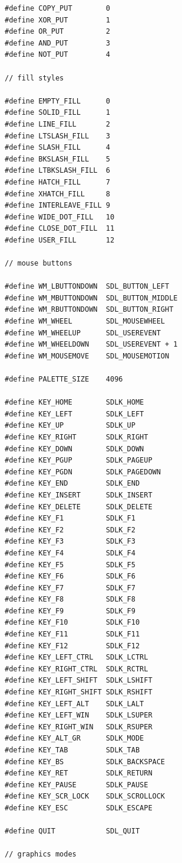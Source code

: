\documentclass[a4paper,11pt]{article}
\begin{document}
\begin{small}
\begin{verbatim}
#define COPY_PUT        0
#define XOR_PUT         1
#define OR_PUT          2
#define AND_PUT         3
#define NOT_PUT         4

// fill styles

#define EMPTY_FILL      0
#define SOLID_FILL      1
#define LINE_FILL       2
#define LTSLASH_FILL    3
#define SLASH_FILL      4
#define BKSLASH_FILL    5
#define LTBKSLASH_FILL  6
#define HATCH_FILL      7
#define XHATCH_FILL     8
#define INTERLEAVE_FILL 9
#define WIDE_DOT_FILL   10
#define CLOSE_DOT_FILL  11
#define USER_FILL       12

// mouse buttons

#define WM_LBUTTONDOWN  SDL_BUTTON_LEFT
#define WM_MBUTTONDOWN  SDL_BUTTON_MIDDLE
#define WM_RBUTTONDOWN  SDL_BUTTON_RIGHT
#define WM_WHEEL        SDL_MOUSEWHEEL
#define WM_WHEELUP      SDL_USEREVENT
#define WM_WHEELDOWN    SDL_USEREVENT + 1
#define WM_MOUSEMOVE    SDL_MOUSEMOTION

#define PALETTE_SIZE    4096

#define KEY_HOME        SDLK_HOME
#define KEY_LEFT        SDLK_LEFT
#define KEY_UP          SDLK_UP
#define KEY_RIGHT       SDLK_RIGHT
#define KEY_DOWN        SDLK_DOWN
#define KEY_PGUP        SDLK_PAGEUP
#define KEY_PGDN        SDLK_PAGEDOWN
#define KEY_END         SDLK_END
#define KEY_INSERT      SDLK_INSERT
#define KEY_DELETE      SDLK_DELETE
#define KEY_F1          SDLK_F1
#define KEY_F2          SDLK_F2
#define KEY_F3          SDLK_F3
#define KEY_F4          SDLK_F4
#define KEY_F5          SDLK_F5
#define KEY_F6          SDLK_F6
#define KEY_F7          SDLK_F7
#define KEY_F8          SDLK_F8
#define KEY_F9          SDLK_F9
#define KEY_F10         SDLK_F10
#define KEY_F11         SDLK_F11
#define KEY_F12         SDLK_F12
#define KEY_LEFT_CTRL   SDLK_LCTRL
#define KEY_RIGHT_CTRL  SDLK_RCTRL
#define KEY_LEFT_SHIFT  SDLK_LSHIFT
#define KEY_RIGHT_SHIFT SDLK_RSHIFT
#define KEY_LEFT_ALT    SDLK_LALT
#define KEY_LEFT_WIN    SDLK_LSUPER
#define KEY_RIGHT_WIN   SDLK_RSUPER
#define KEY_ALT_GR      SDLK_MODE
#define KEY_TAB         SDLK_TAB
#define KEY_BS          SDLK_BACKSPACE
#define KEY_RET         SDLK_RETURN
#define KEY_PAUSE       SDLK_PAUSE
#define KEY_SCR_LOCK    SDLK_SCROLLOCK
#define KEY_ESC         SDLK_ESCAPE

#define QUIT            SDL_QUIT

// graphics modes


\end{verbatim}
\end{small}
\end{document}
